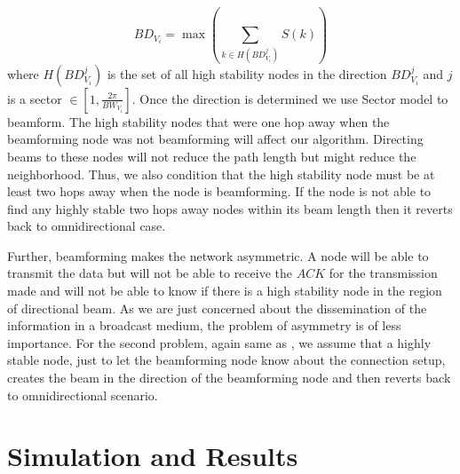 \documentclass[preprint, twocolumn,5p]{elsarticle}
\begin{document}
\begin{equation}\label{eq:bd}
    BD_{V_{i}}=\max_{}\left(\sum_{k\in H(BD_{V_{i}}^{j})}S(k)\right)
\end{equation}
where $H(BD_{V_{i}}^{j})$ is the set of all high stability nodes in the direction $BD_{V_{i}}^{j}$ and $j$ is a sector $\in [1,\frac{2\pi}{BW_{V_{i}}}]$. Once the direction is determined we use Sector model to beamform. The high stability nodes that were one hop away when the beamforming node was not beamforming will affect our algorithm. Directing beams to these nodes will not reduce the path length but might reduce the neighborhood. Thus, we also condition that the high stability node must be at least two hops away when the node is beamforming. If the node is not able to find any highly stable two hops away nodes within its beam length then it reverts back to omnidirectional case.

Further, beamforming makes the network asymmetric. A node will be able to transmit the data but will not be able to receive the $ACK$ for the transmission made and will not be able to know if there is a high stability node in the region of directional beam. As we are just concerned about the dissemination of the information in a broadcast medium, the problem of asymmetry is of less importance. For the second problem, again same as \cite{Agarwal2011,Agarwal2012}, we assume that a highly stable node, just to let the beamforming node know about the connection setup, creates the beam in the direction of the beamforming node and then reverts back to omnidirectional scenario.

\section{Simulation and Results}\label{sec:simresult}
\end{document}
